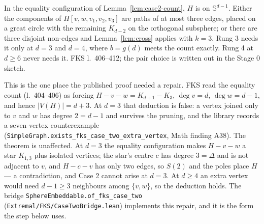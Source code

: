 \begin{lemma}
  \label{lem:case2-place}
  \leanok
  In the equality configuration of Lemma~\ref{lem:case2-count}, $H$ is on
  $\mathbb{S}^{d-1}$. Either the components of $H[v, w, v_1, v_2, v_3]$ are paths of at most
  three edges, placed on a great circle with the remaining $K_{d-2}$ on the orthogonal
  subsphere; or there are three disjoint non-edges and Lemma~\ref{lem:cross} applies with
  $k = 3$. Rung 3 needs it only at $d = 3$ and $d = 4$, where $b = g(d)$ meets the count
  exactly. Rung 4 at $d \ge 6$ never needs it. FKS l.~406--412; the pair choice is written
  out in the Stage 0 sketch.

  This is the one place the published proof needed a repair. FKS read the equality count
  (l.~404--406) as forcing $H - v - w = K_{d+1} - K_3$, $\deg v = d$, $\deg w = d - 1$, and
  hence $\lvert V(H)\rvert = d + 3$. At $d = 3$ that deduction is false: a vertex joined only
  to $v$ and $w$ has degree $2 = d - 1$ and survives the pruning, and the library records a
  seven-vertex counterexample
  (\texttt{SimpleGraph.exists\_fks\_case\_two\_extra\_vertex}, Math finding A38). The theorem
  is unaffected. At $d = 3$ the equality configuration makes $H - v - w$ a star $K_{1,3}$
  plus isolated vertices; the star's centre $c$ has degree $3 = \Delta$ and is not adjacent
  to $v$, and $H - c - v$ has only two edges, so $S(2)$ and the poles place $H$ --- a
  contradiction, and Case 2 cannot arise at $d = 3$. At $d \ge 4$ an extra vertex would need
  $d - 1 \ge 3$ neighbours among $\{v, w\}$, so the deduction holds. The bridge
  \texttt{SphereEmbeddable.of\_fks\_case\_two} (\texttt{Extremal/FKS/CaseTwoBridge.lean})
  implements this repair, and it is the form the step below uses.
\end{lemma}

